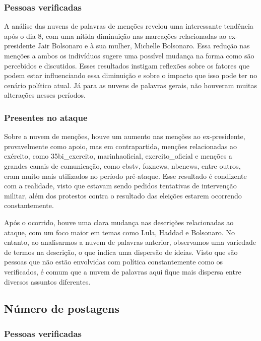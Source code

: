 \documentclass[manuscript,screen,review]{acmart}
\begin{document}
\subsubsection{Pessoas verificadas}

A análise das nuvens de palavras de menções revelou uma interessante tendência após o dia 8, com uma nítida diminuição nas marcações relacionadas ao ex-presidente Jair Bolsonaro e à sua mulher, Michelle Bolsonaro. Essa redução nas menções a ambos os indivíduos sugere uma possível mudança na forma como são percebidos e discutidos. Esses resultados instigam reflexões sobre os fatores que podem estar influenciando essa diminuição e sobre o impacto que isso pode ter no cenário político atual. Já para as nuvens de palavras gerais, não houveram muitas alterações nesses períodos.

\subsubsection{Presentes no ataque}

Sobre a nuvem de menções, houve um aumento nas menções ao ex-presidente, provavelmente como apoio, mas em contrapartida, menções relacionadas ao exército, como 35bi\_exercito, marinhaoficial, exercito\_oficial e menções a grandes canais de comunicação, como cbstv, foxnews, nbcnews, entre outros, eram muito mais utilizados no período pré-ataque. Esse resultado é condizente com a realidade, visto que estavam sendo pedidos tentativas de intervenção militar, além dos protestos contra o resultado das eleições estarem ocorrendo constantemente.

Após o ocorrido, houve uma clara mudança nas descrições relacionadas ao ataque, com um foco maior em temas como Lula, Haddad e Bolsonaro. No entanto, ao analisarmos a nuvem de palavras anterior, observamos uma variedade de termos na descrição, o que indica uma dispersão de ideias. Visto que são pessoas que não estão envolvidas com política constantemente como os verificados, é comum que a nuvem de palavras aqui fique mais dispersa entre diversos assuntos diferentes.

\subsection{Número de postagens}

\subsubsection{Pessoas verificadas}
\end{document}
